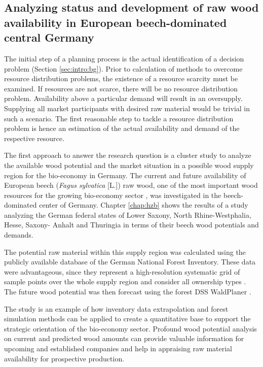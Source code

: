 \subsection{Analyzing status and development of raw wood availability in European beech-dominated central Germany}
\label{subsec:intro:struct:hzb}
The initial step of a planning process is the actual identification of a decision problem (Section \ref{sec:intro:bg}). Prior to calculation of methods to overcome resource distribution problems, the existence of a resource scarcity must be examined. If resources are not scarce, there will be no resource distribution problem. Availability above a particular demand will result in an oversupply. Supplying all market participants with desired raw material would be trivial in such a scenario. The first reasonable step to tackle a resource distribution problem is hence an estimation of the actual availability and demand of the respective resource.

The first approach to answer the research question is a cluster study to analyze the available wood potential and the market situation in a possible wood supply region for the bio-economy in Germany. The current and future availability of European beech (\textit{Fagus sylvatica} [L.]) raw wood, one of the most important wood resources for the growing bio-economy sector \citep[p. 16]{auer_2016}, was investigated in the beech-dominated center of Germany. Chapter \ref{chap:hzb} shows the results of a study analyzing the German federal states of Lower Saxony, North Rhine-Westphalia, Hesse, Saxony- Anhalt and Thuringia in terms of their beech wood potentials and demands.

The potential raw material within this supply region was calculated using the publicly available database of the German National Forest Inventory. These data were advantageous, since they represent a high-resolution systematic grid of sample points over the whole supply region and consider all ownership types \citep{schmitz_2008}. The future wood potential was then forecast using the forest DSS WaldPlaner \citep{hansen_2014}.

The study is an example of how inventory data extrapolation and forest simulation methods can be applied to create a quantitative base to support the strategic orientation of the bio-economy sector. Profound wood potential analysis on current and predicted wood amounts can provide valuable information for upcoming and established companies and help in appraising raw material availability for prospective production.

